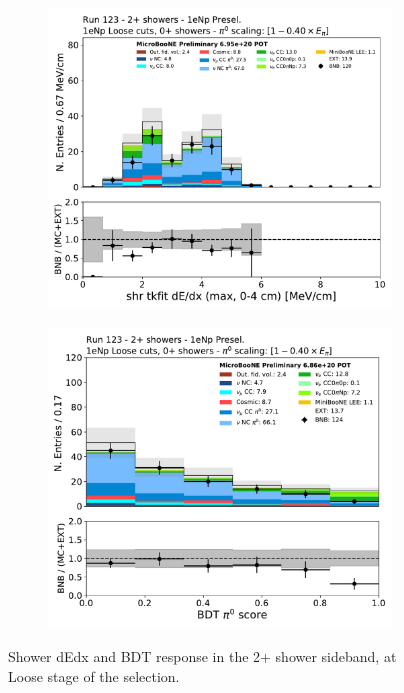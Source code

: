 \begin{figure}[H]
    \begin{center}
    \begin{subfigure}{0.4\textwidth}
    \includegraphics[width=1.00\textwidth]{Sidebands/Figures/1eNp/TwoShower/TwoPShr_NP_NPLAllShr_pi0e040/shr_tkfit_dedx_max.pdf}
    \end{subfigure}
    \begin{subfigure}{0.4\textwidth}
    \includegraphics[width=1.00\textwidth]{Sidebands/Figures/1eNp/TwoShower/TwoPShr_NP_NPLAllShr_pi0e040/pi0_score.pdf}
    \end{subfigure}
    \caption{\label{fig:sb:1eNp:twopshr:loose:dedxbdt} Shower dEdx and BDT response in the 2+ shower sideband, at Loose stage of the \npsel selection.}
    \end{center}
\end{figure}

